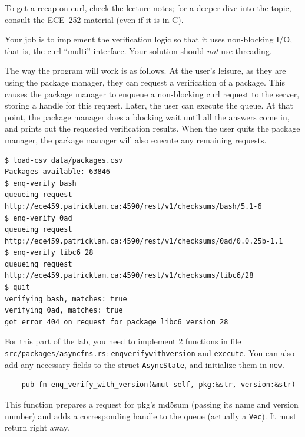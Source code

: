 \documentclass[12pt]{article}
\renewcommand{\_}{\kern-1.5pt\textunderscore\kern-1.5pt}
\begin{document}
\vspace{1em}
To get a recap on curl, check the lecture notes; for a deeper dive into the topic, consult the ECE~252 material (even if it is in C).\par

\vspace{1em}
Your job is to implement the verification logic so that it uses non-blocking I/O, that is, the curl ``multi'' interface. Your solution should \textit{not} use threading. \par

\vspace{1em}
The way the program will work is as follows. At the user's leisure, as they are using the package manager, they can request a verification of a package. This causes the package manager to enqueue a non-blocking curl request to the server, storing a handle for this request. Later, the user can execute the queue. At that point, the package manager does a blocking wait until all the answers come in, and prints out the requested verification results. When the user quits the package manager, the package manager will also execute any remaining requests.\par

\begin{verbatim}
$ load-csv data/packages.csv
Packages available: 63846
$ enq-verify bash
queueing request http://ece459.patricklam.ca:4590/rest/v1/checksums/bash/5.1-6
$ enq-verify 0ad
queueing request http://ece459.patricklam.ca:4590/rest/v1/checksums/0ad/0.0.25b-1.1
$ enq-verify libc6 28
queueing request http://ece459.patricklam.ca:4590/rest/v1/checksums/libc6/28
$ quit
verifying bash, matches: true
verifying 0ad, matches: true
got error 404 on request for package libc6 version 28
\end{verbatim}

\vspace{1em}
For this part of the lab, you need to implement 2 functions in file \texttt{src/packages/async\_fns.rs}: \texttt{enq\_verify\_with\_version} and \texttt{execute}. You can also add any necessary fields to the struct \texttt{AsyncState}, and initialize them in \texttt{new}.

\vspace{1em}
\begin{verbatim}
    pub fn enq_verify_with_version(&mut self, pkg:&str, version:&str)
\end{verbatim}
This function prepares a request for pkg's md5sum (passing its name and version number) and adds a
corresponding handle to the queue (actually a \texttt{Vec}). It must
return right away.
\end{document}
